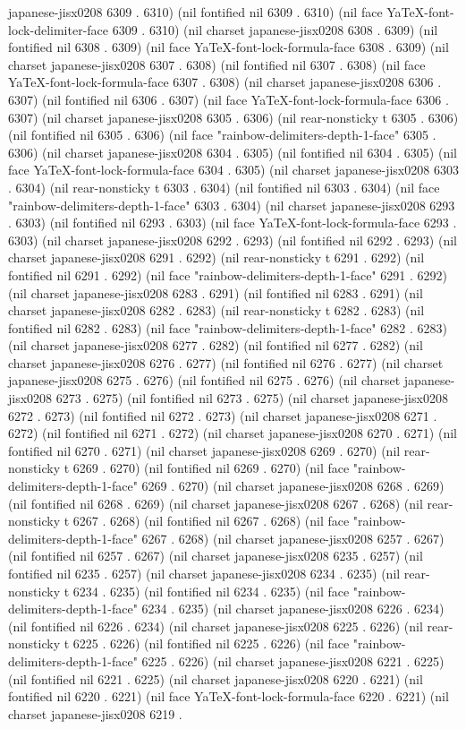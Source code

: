 japanese-jisx0208 6309 . 6310) (nil fontified nil 6309 . 6310) (nil face YaTeX-font-lock-delimiter-face 6309 . 6310) (nil charset japanese-jisx0208 6308 . 6309) (nil fontified nil 6308 . 6309) (nil face YaTeX-font-lock-formula-face 6308 . 6309) (nil charset japanese-jisx0208 6307 . 6308) (nil fontified nil 6307 . 6308) (nil face YaTeX-font-lock-formula-face 6307 . 6308) (nil charset japanese-jisx0208 6306 . 6307) (nil fontified nil 6306 . 6307) (nil face YaTeX-font-lock-formula-face 6306 . 6307) (nil charset japanese-jisx0208 6305 . 6306) (nil rear-nonsticky t 6305 . 6306) (nil fontified nil 6305 . 6306) (nil face "rainbow-delimiters-depth-1-face" 6305 . 6306) (nil charset japanese-jisx0208 6304 . 6305) (nil fontified nil 6304 . 6305) (nil face YaTeX-font-lock-formula-face 6304 . 6305) (nil charset japanese-jisx0208 6303 . 6304) (nil rear-nonsticky t 6303 . 6304) (nil fontified nil 6303 . 6304) (nil face "rainbow-delimiters-depth-1-face" 6303 . 6304) (nil charset japanese-jisx0208 6293 . 6303) (nil fontified nil 6293 . 6303) (nil face YaTeX-font-lock-formula-face 6293 . 6303) (nil charset japanese-jisx0208 6292 . 6293) (nil fontified nil 6292 . 6293) (nil charset japanese-jisx0208 6291 . 6292) (nil rear-nonsticky t 6291 . 6292) (nil fontified nil 6291 . 6292) (nil face "rainbow-delimiters-depth-1-face" 6291 . 6292) (nil charset japanese-jisx0208 6283 . 6291) (nil fontified nil 6283 . 6291) (nil charset japanese-jisx0208 6282 . 6283) (nil rear-nonsticky t 6282 . 6283) (nil fontified nil 6282 . 6283) (nil face "rainbow-delimiters-depth-1-face" 6282 . 6283) (nil charset japanese-jisx0208 6277 . 6282) (nil fontified nil 6277 . 6282) (nil charset japanese-jisx0208 6276 . 6277) (nil fontified nil 6276 . 6277) (nil charset japanese-jisx0208 6275 . 6276) (nil fontified nil 6275 . 6276) (nil charset japanese-jisx0208 6273 . 6275) (nil fontified nil 6273 . 6275) (nil charset japanese-jisx0208 6272 . 6273) (nil fontified nil 6272 . 6273) (nil charset japanese-jisx0208 6271 . 6272) (nil fontified nil 6271 . 6272) (nil charset japanese-jisx0208 6270 . 6271) (nil fontified nil 6270 . 6271) (nil charset japanese-jisx0208 6269 . 6270) (nil rear-nonsticky t 6269 . 6270) (nil fontified nil 6269 . 6270) (nil face "rainbow-delimiters-depth-1-face" 6269 . 6270) (nil charset japanese-jisx0208 6268 . 6269) (nil fontified nil 6268 . 6269) (nil charset japanese-jisx0208 6267 . 6268) (nil rear-nonsticky t 6267 . 6268) (nil fontified nil 6267 . 6268) (nil face "rainbow-delimiters-depth-1-face" 6267 . 6268) (nil charset japanese-jisx0208 6257 . 6267) (nil fontified nil 6257 . 6267) (nil charset japanese-jisx0208 6235 . 6257) (nil fontified nil 6235 . 6257) (nil charset japanese-jisx0208 6234 . 6235) (nil rear-nonsticky t 6234 . 6235) (nil fontified nil 6234 . 6235) (nil face "rainbow-delimiters-depth-1-face" 6234 . 6235) (nil charset japanese-jisx0208 6226 . 6234) (nil fontified nil 6226 . 6234) (nil charset japanese-jisx0208 6225 . 6226) (nil rear-nonsticky t 6225 . 6226) (nil fontified nil 6225 . 6226) (nil face "rainbow-delimiters-depth-1-face" 6225 . 6226) (nil charset japanese-jisx0208 6221 . 6225) (nil fontified nil 6221 . 6225) (nil charset japanese-jisx0208 6220 . 6221) (nil fontified nil 6220 . 6221) (nil face YaTeX-font-lock-formula-face 6220 . 6221) (nil charset japanese-jisx0208 6219 . 